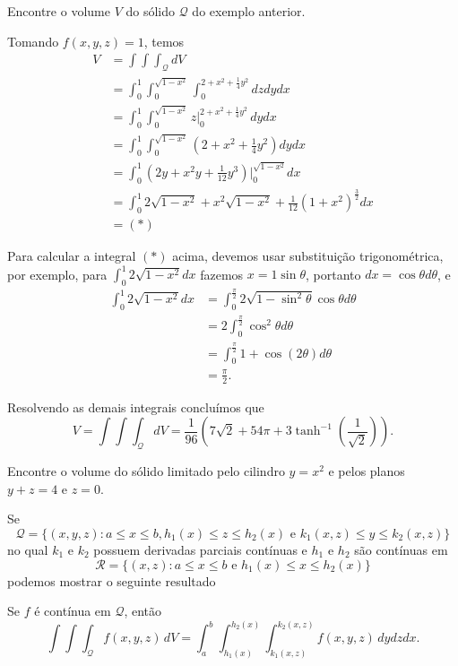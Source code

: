 \begin{example}
    Encontre o volume \(V\) do sólido \(\mathcal{Q}\) do exemplo anterior.

    Tomando \(f(x,y,z) = 1\), temos
        \begin{align*}
            V
                & = \int\int\int_\mathcal{Q} dV \\
                & = \int_0^1 \int_0^{\sqrt{1-x^2}} \int_0^{2+x^2+\frac{1}{4}y^2} dz dy dx \\
                & = \int_0^1 \int_0^{\sqrt{1-x^2}} z\bigg|_0^{2+x^2+\frac{1}{4}y^2} \, dy dx \\
                & = \int_0^1 \int_0^{\sqrt{1-x^2}} \left( 2 + x^2 + \frac{1}{4} y^2 \right) dy dx \\
                & = \int_0^1 \left( 2y + x^2 y + \frac{1}{12}y^3 \right)\bigg|_0^{\sqrt{1-x^2}} dx \\
                & = \int_0^1 2\sqrt{1-x^2} + x^2\sqrt{1-x^2} + \frac{1}{12}(1+x^2)^{\frac{3}{2}} dx \\
                & = (*)
        \end{align*}

    Para calcular a integral \((*)\) acima, devemos usar substituição trigonométrica, por exemplo, para \(\int_0^1 2\sqrt{1-x^2} dx\) fazemos \(x = 1\sin\theta\), portanto \(dx = \cos\theta d\theta\), e
        \begin{align*}
            \int_0^1 2\sqrt{1-x^2} dx
                & = \int_0^{\frac{\pi}{2}} 2\sqrt{1-\sin^2\theta} \cos\theta d\theta \\
                & = 2\int_0^{\frac{\pi}{2}} \cos^2\theta d\theta \\
                & = \int_0^{\frac{\pi}{2}} 1 + \cos(2\theta) d\theta \\
                & = \frac{\pi}{2}.
        \end{align*}

    Resolvendo as demais integrais concluímos que \[V = \int\int\int_\mathcal{Q} dV = \frac{1}{96}\left( 7\sqrt{2} + 54\pi + 3\tanh^{-1}\left( \frac{1}{\sqrt{2}} \right) \right). \]
\end{example}

\begin{exercise}
    Encontre o volume do sólido limitado pelo cilindro \(y=x^2\) e pelos planos \(y+z=4\) e \(z=0\).
\end{exercise}

Se \[\mathcal{Q} = \{(x,y,z) : a\leq x\leq b, h_1(x) \leq z\leq h_2(x) \text{ e } k_1(x,z)\leq y\leq k_2(x,z)\}\] no qual \(k_1\) e \(k_2\) possuem derivadas parciais contínuas e \(h_1\) e \(h_2\) são contínuas em \[\mathcal{R} = \{(x,z) : a\leq x\leq b \text{ e } h_1(x)\leq x\leq h_2(x)\}\] podemos mostrar o seguinte resultado
\begin{theorem}
    Se \(f\) é contínua em \(\mathcal{Q}\), então \[\int\int\int_\mathcal{Q} f(x,y,z)\, dV = \int_a^b \int_{h_1(x)}^{h_2(x)} \int_{k_1(x,z)}^{k_2(x,z)} f(x,y,z)\, dy dz dx.\]
\end{theorem}

